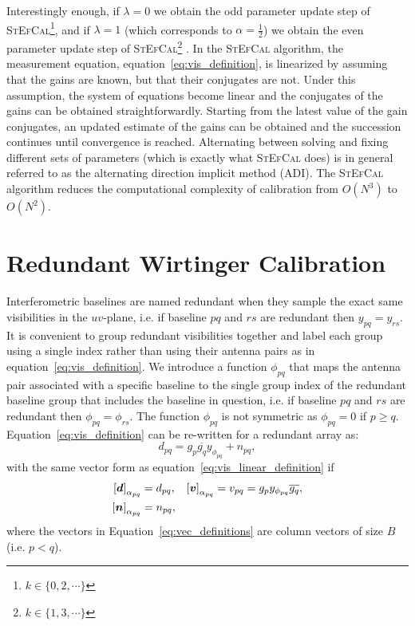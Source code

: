 \documentclass[useAMS,usenatbib]{mn2e}
\newcommand{\bd}{\bmath{d}}
\newcommand{\bv}{\bmath{v}}
\newcommand{\bn}{\bmath{n}}
\newcommand{\conj}[1]{\overline{#1}}
\begin{document}
Interestingly enough, if $\lambda = 0$ we obtain the odd parameter update step of \textsc{StEfCal}\footnote{$k\in\{0,2,\cdots\}$}, and if $\lambda=1$ (which corresponds
to $\alpha=\frac{1}{2}$) we obtain the even parameter update step of \textsc{StEfCal}\footnote{$k\in\{1,3,\cdots\}$} \citep[\textsc{StEfCal},][]{Mitchell:MWA-cal,Salvini2014}. In the \textsc{StEfCal} algorithm, the measurement equation, equation~\ref{eq:vis_definition}, is linearized by assuming that the gains are known, but that their conjugates are not. Under this assumption, the system of equations become linear and the conjugates of the gains can be obtained straightforwardly. Starting from the latest value of the gain conjugates, an updated estimate of the gains can be obtained and the succession continues until convergence is reached.
Alternating between solving and fixing different sets of parameters (which is exactly what \textsc{StEfCal} does) is in general referred to 
as the alternating direction implicit method (ADI). The \textsc{StEfCal} algorithm reduces the computational complexity of calibration from $O(N^3)$ to $O(N^2)$.

\section{Redundant Wirtinger Calibration}
\label{sec:red_wirtinger}
Interferometric baselines are named redundant when they sample the exact same visibilities in the $uv$-plane, i.e. if baseline $pq$ and $rs$ are redundant then $y_{pq} = y_{rs}$. It is convenient to group redundant visibilities together and label each group using a single index rather than using their antenna pairs as in equation~\ref{eq:vis_definition}. We introduce a function $\phi_{pq}$ that maps the antenna pair associated with a specific baseline to the single group index of the redundant baseline group that includes the baseline in question, i.e. if baseline $pq$ and $rs$ are redundant then $\phi_{pq} = \phi_{rs}$. The function $\phi_{pq}$ is not symmetric as $\phi_{pq} = 0$ if $p \geq q$. Equation~\ref{eq:vis_definition} can be re-written for a redundant array as:
\begin{equation}
\label{eq:vis_red}
d_{pq} = g_{p}\conj{g_q}y_{\phi_{pq}} + n_{pq},
\end{equation}
with the same vector form as equation~\ref{eq:vis_linear_definition} if
\begin{align}
 \left [ \bd \right]_{\alpha_{pq}} &= d_{pq}, & \left [ \bv \right ]_{\alpha_{pq}} &= v_{pq}=g_p y_{\phi_{pq}} \conj{g_q},\nonumber\\
 \left [ \bn \right ]_{\alpha_{pq}} &= n_{pq}, &  &\label{eq:vec_definitions}
\end{align}
where the vectors in Equation~\ref{eq:vec_definitions} are column vectors of size $B$ (i.e. $p<q$).
\end{document}
